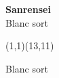 \documentclass[preview, border=0pt, varwidth=false]{standalone}
\begin{document}
	\setgounit{0.6cm} 
	
\parbox[c][14.65cm][c]{10.2cm}{
	\centering
	
	{\Large\textbf{Sanrensei} \\ Blanc sort}
	\vspace{3em}
	
	\begin{psgopartialboard}{(1,1)(13,11)}
		\pass
	\end{psgopartialboard}
	
	\vspace{1em}
	Blanc sort
}
\end{document}
